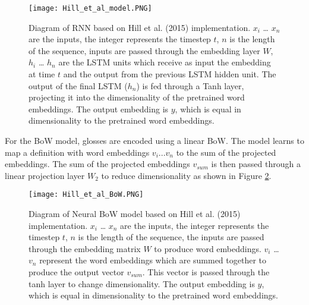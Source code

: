 \documentclass[11pt]{article}
\begin{document}
\begin{spacing}{1}
\begin{figure}[!htpb]
\centering
\texttt{[image: Hill\_et\_al\_model.PNG]}
\caption{Diagram of RNN based on Hill et al. (2015) implementation. $x_i$ … $x_n$ are the inputs, the integer represents the timestep $t$, $n$ is the length of the sequence, inputs are passed through the embedding layer $W$, $h_i$ … $h_n$ are the LSTM units which receive as input the embedding at time $t$ and the output from the previous LSTM hidden unit. The output of the final LSTM ($h_n$) is fed through a Tanh layer, projecting it into the dimensionality of the pretrained word embeddings. The output embedding is $y$, which is equal in dimensionality to the pretrained word embeddings.}
\label{hill_recurrent}
\end{figure}

For the BoW model, glosses are encoded using a linear BoW. The model learns to map a definition with word embeddings $v_i...v_n$ to the sum of the projected embeddings. The sum of the projected embeddings $v_{sum}$ is then passed through a linear projection layer $W_2$ to reduce dimensionality as shown in Figure \ref{hill_BoW}.

\begin{figure}[!htpb]
\centering
\texttt{[image: Hill\_et\_al\_BoW.PNG]}
\caption{Diagram of Neural BoW model based on Hill et al. (2015) implementation.
$x_i$ … $x_n$ are the inputs, the integer represents the timestep $t$, $n$ is the length of the sequence, the inputs are passed through the embedding matrix $W$ to produce word embeddings. $v_i$ … $v_n$ represent the word embeddings which are summed together to produce the output vector $v_{sum}$. This vector is passed through the tanh layer to change dimensionality. The output embedding is $y$, which is equal in dimensionality to the pretrained word embeddings.}
\label{hill_BoW}
\end{figure}


\end{spacing}
\end{document}
